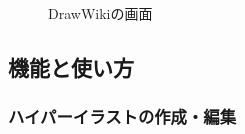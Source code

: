 \begin{figure}[htbp]
    \begin{center}
         \end{center}
    \caption{DrawWikiの画面}
    \label{drawwiki}
\end{figure}

\subsection{機能と使い方}

\subsubsection{ハイパーイラストの作成・編集}


